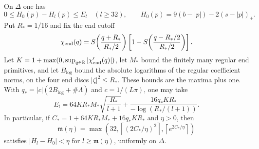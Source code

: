 \begin{proposition}\label{prop:sxm-bordered}
On $\Delta$ one has
\[
 0\le H_0(p)-H_l(p)\le E_l\quad(l\ge32),\qquad
 H_0(p)=9(b-|p|)-2(s-|p|)_+.
\]
Put $R_*=1/16$ and fix the end cutoff
\[
 \chi_{\rm end}(q)=S\!\left(\frac{q+R_*}{R_*/2}\right)
             \left[1-S\!\left(\frac{q-R_*/2}{R_*/2}\right)\right].
\]
Let $K=1+\max(0,\sup_{q\in\mathbb{R}}|\chi_{\rm end}'(q)|)$, let $M_*$ bound the finitely many regular end primitives, and let $B_{\log}$ bound the
absolute logarithms of the regular coefficient norms, on the four end discs
$|\zeta|^2\le R_*$. These bounds are the maxima plus one.
With $q_*=|c|(2B_{\log}+\#\Lambda)$ and $c=1/(L\pi)$, one may take
\[
 E_l=64KR_*M_*\sqrt{\frac{R_*}{l+1}}
       +\frac{16q_*KR_*}{-\log(R_* /(l+1))}.
\]
In particular, if $C_*=1+64KR_*M_*+16q_*KR_*$ and $\eta>0$, then
\[
 \mathfrak m(\eta)=\max\left(32,\left\lceil(2C_*/\eta)^2\right\rceil,
                            \left\lceil e^{2C_*/\eta}\right\rceil\right)
\]
satisfies $|H_l-H_0|<\eta$ for $l\ge\mathfrak m(\eta)$, uniformly on $\Delta$.
\end{proposition}

